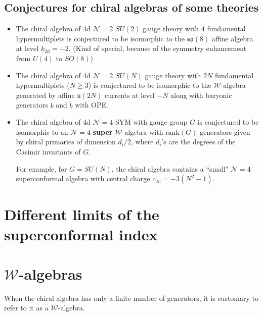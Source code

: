 \documentclass[a4paper,11pt]{article}
\begin{document}
\subsection{Conjectures for chiral algebras of some theories}
\begin{itemize}
    \item The chiral algebra of 4d $\mathcal{N}=2$ $SU(2)$ gauge theory with $4$ fundamental hypermultiplets is conjectured to be isomorphic to the $\mathfrak{so}(8)$ affine algebra at level $k_\mathrm{2d} = -2$. (Kind of special, because of the symmetry enhancement from $U(4)$ to $SO(8)$)
    \item The chiral algebra of 4d $\mathcal{N}=2$ $SU(N)$ gauge theory with $2N$ fundamental hypermultiplets ($N\geq 3$) is conjectured to be isomorphic to the $\mathcal{W}$-algebra generated by affine $\mathfrak{u}(2N)$ currents at level $-N$ along with baryonic generators $b$ and $\tilde{b}$ with OPE.
    \item The chiral algebra of 4d $\mathcal{N}=4$ SYM with gauge group $G$ is conjectured to be isomorphic to an $\mathcal{N}=4$ \textbf{super} $\mathcal{W}$-algebra with $\mathrm{rank}(G)$ generators given by chiral primaries of dimension $d_i/2$, where $d_i$'s are the degrees of the Casimir invariants of $G$.

    For example, for $G= SU(N)$, the chiral algebra contains a ``small" $\mathcal{N}=4$ superconformal algebra with central charge $c_\mathrm{2d} = -3 (N^2-1)$.
\end{itemize}



\newpage
\appendix
\section{Different limits of the superconformal index}

\section{$\mathcal{W}$-algebras}
When the chiral algebra has only a finite number of generators, it is customary to refer to it as a $\mathcal{W}$-algebra.












\end{document}
